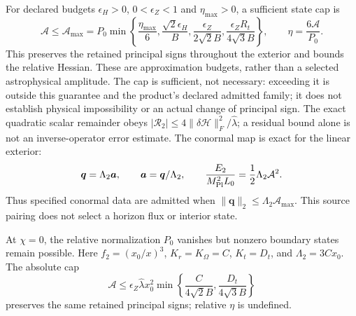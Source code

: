 For declared budgets $\epsilon_H>0$, $0<\epsilon_Z<1$ and
$\eta_{\max}>0$, a sufficient state cap is
\begin{equation}
 \mathcal A\le\mathcal A_{\max}=P_0\min\left\{
 \frac{\eta_{\max}}6,\frac{\sqrt2\epsilon_H}B,
 \frac{\epsilon_Z}{2\sqrt2B},
 \frac{\epsilon_ZR_t}{4\sqrt3B}\right\},\qquad
 \eta=\frac{6\mathcal A}{P_0}.
 \label{eq:admission-cap}
\end{equation}
This preserves the retained principal signs throughout the exterior and
bounds the relative Hessian. These are approximation budgets, rather than
a selected astrophysical amplitude. The cap is sufficient, not necessary:
exceeding it is outside this guarantee and the product's declared admitted
family; it does not establish physical impossibility or an actual change
of principal sign. The exact quadratic scalar remainder
obeys $|\mathcal R_2|\le4\|\delta\mathcal H\|_F^2/
\widehat\lambda$; a residual bound alone is not an inverse-operator error
estimate. The conormal map is exact for the linear exterior:
\begin{equation}
 \boldsymbol q=\Lambda_2\boldsymbol a,\qquad
 \boldsymbol a=\boldsymbol q/\Lambda_2,\qquad
 \frac{E_2}{M_{\rm Pl}^2L_0}=\frac12\Lambda_2\mathcal A^2.
 \label{eq:admission-conormal}
\end{equation}
Thus specified conormal data are admitted when
$\|\boldsymbol q\|_2\le\Lambda_2\mathcal A_{\max}$.
This source pairing does not select a horizon flux or interior state.

At $\chi=0$, the relative normalization $P_0$ vanishes but nonzero
boundary states remain possible. Here $f_2=(x_0/x)^3$,
$K_r=K_\Omega=C$, $K_t=D_t$, and $\Lambda_2=3Cx_0$. The absolute cap
\begin{equation}
 \mathcal A\le\epsilon_Z\widehat\lambda x_0^2
 \min\left\{\frac{C}{4\sqrt2B},\frac{D_t}{4\sqrt3B}\right\}
 \label{eq:admission-zero-flux}
\end{equation}
preserves the same retained principal signs; relative $\eta$ is undefined.


